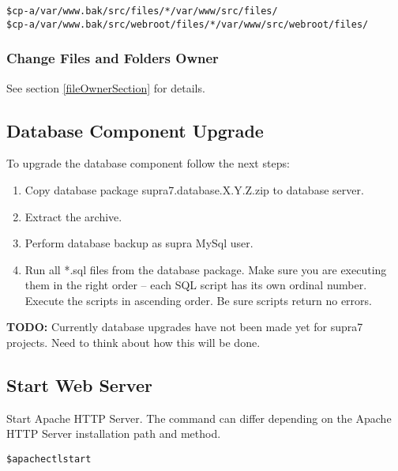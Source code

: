 \documentclass[12pt]{article}
\newcommand{\vigShowNotes}{1}
\newcommand{\vigPackageName}{supra7}
\newcommand{\vigPathToProject}{/var/www}
\newcommand{\vigPathToSrc}{/src}
\newcommand{\todo}[1]{
\textbf{TODO:} 
#1
}
\begin{document}
\begin{alltt}
\$ cp -a \vigPathToProject.bak\vigPathToSrc/files/* \vigPathToProject\vigPathToSrc/files/
\$ cp -a \vigPathToProject.bak\vigPathToSrc/webroot/files/* \vigPathToProject\vigPathToSrc/webroot/files/
\end{alltt}

\subsubsection{Change Files and Folders Owner}

See section \ref{fileOwnerSection} for details.

\subsection{Database Component Upgrade}
To upgrade the database component follow the next steps:

\begin{enumerate}
	\item Copy database package {\vigPackageName}.database.X.Y.Z.zip to database server.
	\item Extract the archive.
	\item Perform database backup as \textsf{supra} MySql user.
	\item Run all *.sql files from the database package. Make sure you are executing them in the right order -- each SQL script has its own ordinal number. Execute the scripts in ascending order. Be sure scripts return no errors.
\end{enumerate}

\todo{Currently database upgrades have not been made yet for supra7 projects. Need to think about how this will be done.}

\subsection{Start Web Server}
Start Apache HTTP Server. The command can differ depending on the Apache HTTP Server installation path and method.

\begin{alltt}
\$ apachectl start
\end{alltt}
\end{document}
